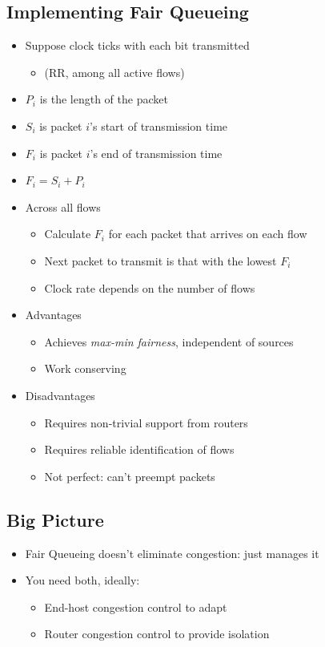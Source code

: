\subsection{Implementing Fair Queueing}
\begin{itemize}[nosep]
    \item Suppose clock ticks with each bit transmitted
          \begin{itemize}[nosep]
              \item (RR, among all active flows)
          \end{itemize}
    \item $P_i$ is the length of the packet
    \item $S_i$ is packet $i$'s start of transmission time
    \item $F_i$ is packet $i$'s end of transmission time
    \item $F_i = S_i + P_i$
    \item Across all flows
          \begin{itemize}[nosep]
              \item Calculate $F_i$ for each packet that arrives on each flow
              \item Next packet to transmit is that with the lowest $F_i$
              \item Clock rate depends on the number of flows
          \end{itemize}
    \item Advantages
          \begin{itemize}[nosep]
              \item Achieves \emph{max-min fairness}, independent of sources
              \item Work conserving
          \end{itemize}
    \item Disadvantages
          \begin{itemize}[nosep]
              \item Requires non-trivial support from routers
              \item Requires reliable identification of flows
              \item Not perfect: can't preempt packets
          \end{itemize}
\end{itemize}
\subsection{Big Picture}
\begin{itemize}[nosep]
    \item Fair Queueing doesn't eliminate congestion: just manages it
    \item You need both, ideally:
          \begin{itemize}[nosep]
              \item End-host congestion control to adapt
              \item Router congestion control to provide isolation
          \end{itemize}
\end{itemize}
